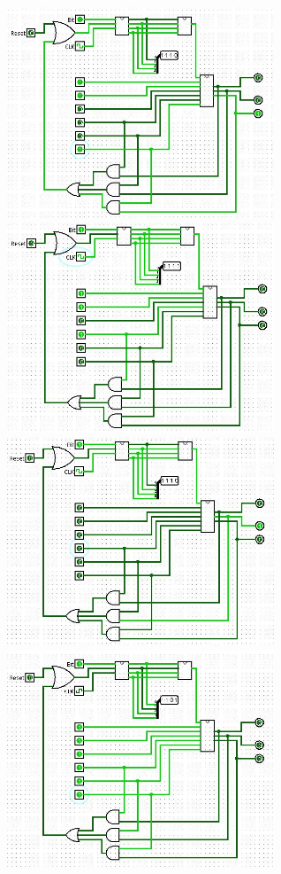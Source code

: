 \documentclass[a4paper]{article}
\begin{document}
\begin{center}
	\includegraphics[width=0.6\textwidth]{tarea-2-prueba-38.jpg}
	\includegraphics[width=0.6\textwidth]{tarea-2-prueba-39.jpg}
	\includegraphics[width=0.6\textwidth]{tarea-2-prueba-40.jpg}
	\includegraphics[width=0.6\textwidth]{tarea-2-prueba-41.jpg}

\end{center}
\end{document}
